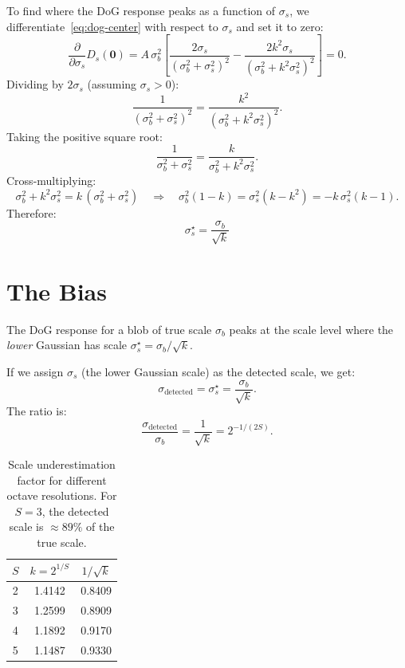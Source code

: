 \documentclass[11pt]{article}
\begin{document}
To find where the DoG response peaks as a function of $\sigma_s$, we
differentiate~\eqref{eq:dog-center} with respect to $\sigma_s$ and set it
to zero:
\begin{equation}
  \frac{\partial}{\partial \sigma_s} D_s(\mathbf{0})
    = A\,\sigma_b^2
      \left[
        \frac{2\sigma_s}{(\sigma_b^2 + \sigma_s^2)^2}
        - \frac{2k^2\sigma_s}{(\sigma_b^2 + k^2\sigma_s^2)^2}
      \right]
    = 0.
\end{equation}
Dividing by $2\sigma_s$ (assuming $\sigma_s > 0$):
\begin{equation}
  \frac{1}{(\sigma_b^2 + \sigma_s^2)^2}
    = \frac{k^2}{(\sigma_b^2 + k^2\sigma_s^2)^2}.
\end{equation}
Taking the positive square root:
\begin{equation}
  \frac{1}{\sigma_b^2 + \sigma_s^2}
    = \frac{k}{\sigma_b^2 + k^2\sigma_s^2}.
\end{equation}
Cross-multiplying:
\begin{equation}
  \sigma_b^2 + k^2\sigma_s^2 = k\,(\sigma_b^2 + \sigma_s^2)
  \quad\Longrightarrow\quad
  \sigma_b^2(1 - k) = \sigma_s^2(k - k^2) = -k\,\sigma_s^2(k - 1).
\end{equation}
Therefore:
\begin{equation}
  \boxed{\sigma_s^{\star} = \frac{\sigma_b}{\sqrt{k}}}
  \label{eq:peak}
\end{equation}

\section{The Bias}

The DoG response for a blob of true scale $\sigma_b$ peaks at the scale
level where the \emph{lower} Gaussian has scale
$\sigma_s^\star = \sigma_b / \sqrt{k}$.

If we assign $\sigma_s$ (the lower Gaussian scale) as the detected scale,
we get:
\begin{equation}
  \sigma_{\text{detected}} = \sigma_s^\star = \frac{\sigma_b}{\sqrt{k}}.
\end{equation}
The ratio is:
\begin{equation}
  \frac{\sigma_{\text{detected}}}{\sigma_b} = \frac{1}{\sqrt{k}}
    = 2^{-1/(2S)}.
\end{equation}

\begin{table}[h]
\centering
\begin{tabular}{@{}ccc@{}}
\toprule
$S$ & $k = 2^{1/S}$ & $1/\sqrt{k}$ \\
\midrule
2 & 1.4142 & 0.8409 \\
3 & 1.2599 & 0.8909 \\
4 & 1.1892 & 0.9170 \\
5 & 1.1487 & 0.9330 \\
\bottomrule
\end{tabular}
\caption{Scale underestimation factor for different octave resolutions.
For $S=3$, the detected scale is $\approx 89\%$ of the true scale.}
\end{table}
\end{document}
